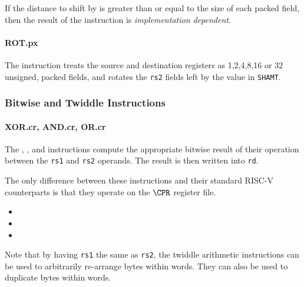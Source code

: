 If the distance to shift by is greater than or equal to the size of each
packed field, then the result of the  instruction is
{\em implementation dependent}.

\paragraph{ROT.px}

The instruction  treats the source and destination registers as
1,2,4,8,16 or 32 unsigned, packed fields, and rotates the {\tt rs2} fields
left by the value in {\tt SHAMT}.

\subsubsection{Bitwise and Twiddle Instructions}

\paragraph{XOR.cr, AND.cr, OR.cr}

The , , and  instructions compute the
appropriate bitwise result of their operation between the {\tt rs1} and
{\tt rs2} operands. The result is then written into {\tt rd}.

The only difference between these instructions and their standard RISC-V
counterparts is that they operate on the $\CPR$ register file.

\begin{itemize}
\item {}
\item {}
\item {}
\end{itemize}

Note that by having {\tt rs1} the same as {\tt rs2}, the twiddle
arithmetic instructions can be used to arbitrarily re-arrange bytes
within words. They can also be used to duplicate bytes within words.

